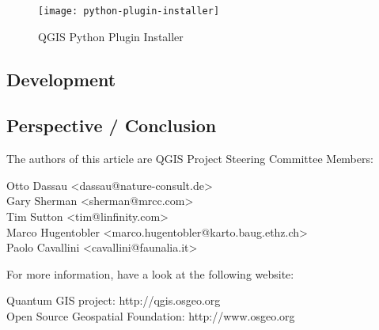 \begin{figure}[h]
   \begin{center}
   \caption{QGIS Python Plugin Installer}\label{fig:python-plugin}\smallskip
   \texttt{[image: python-plugin-installer]}
\end{center}
\end{figure}


\subsection{Development}

\subsection{Perspective / Conclusion}


The authors of this article are QGIS Project Steering Committee Members:

Otto Dassau <dassau@nature-consult.de>  
\\Gary Sherman <sherman@mrcc.com>
\\Tim Sutton <tim@linfinity.com>
\\Marco Hugentobler <marco.hugentobler@karto.baug.ethz.ch>
\\Paolo Cavallini <cavallini@faunalia.it>


For more information, have a look at the following website:

Quantum GIS project: http://qgis.osgeo.org
\\Open Source Geospatial Foundation: http://www.osgeo.org
 


 



